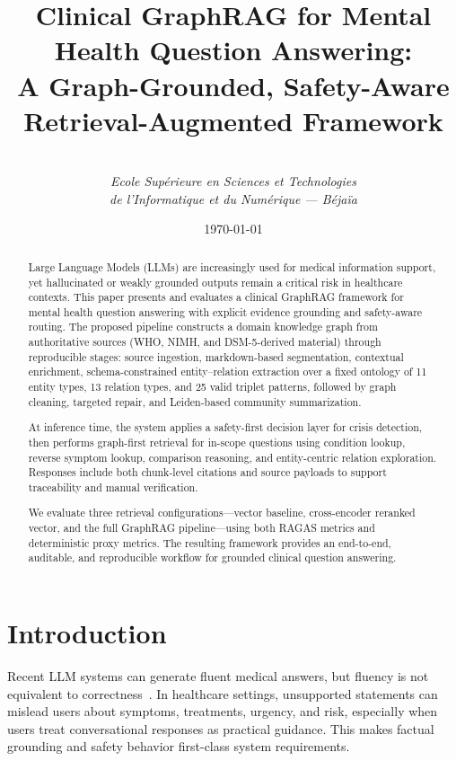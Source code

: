 \documentclass[12pt,a4paper]{article}
\title{\textbf{Clinical GraphRAG for Mental Health Question Answering:\\ A Graph-Grounded, Safety-Aware Retrieval-Augmented Framework}}
\author{
\\
\textit{Ecole Sup\'{e}rieure en Sciences et Technologies}\\
\textit{de l'Informatique et du Num\'{e}rique --- B\'{e}ja\"{i}a}
}
\date{\today}
\begin{document}
\maketitle

\begin{abstract}
Large Language Models (LLMs) are increasingly used for medical information support, yet hallucinated or weakly grounded outputs remain a critical risk in healthcare contexts. This paper presents and evaluates a clinical GraphRAG framework for mental health question answering with explicit evidence grounding and safety-aware routing. The proposed pipeline constructs a domain knowledge graph from authoritative sources (WHO, NIMH, and DSM-5-derived material) through reproducible stages: source ingestion, markdown-based segmentation, contextual enrichment, schema-constrained entity--relation extraction over a fixed ontology of 11 entity types, 13 relation types, and 25 valid triplet patterns, followed by graph cleaning, targeted repair, and Leiden-based community summarization.

At inference time, the system applies a safety-first decision layer for crisis detection, then performs graph-first retrieval for in-scope questions using condition lookup, reverse symptom lookup, comparison reasoning, and entity-centric relation exploration. Responses include both chunk-level citations and source payloads to support traceability and manual verification.

We evaluate three retrieval configurations---vector baseline, cross-encoder reranked vector, and the full GraphRAG pipeline---using both RAGAS metrics and deterministic proxy metrics. The resulting framework provides an end-to-end, auditable, and reproducible workflow for grounded clinical question answering.
\end{abstract}

\section{Introduction}

Recent LLM systems can generate fluent medical answers, but fluency is not equivalent to correctness~\cite{ji2023hallucination}. In healthcare settings, unsupported statements can mislead users about symptoms, treatments, urgency, and risk, especially when users treat conversational responses as practical guidance. This makes factual grounding and safety behavior first-class system requirements.
\end{document}
